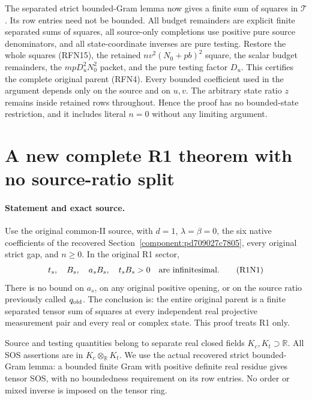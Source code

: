 The separated strict bounded-Gram lemma now gives a finite sum of
squares in $\mathcal T$.  Its row entries need not be bounded.  All
budget remainders are explicit finite separated sums of squares, all
source-only completions use positive pure source denominators, and
all state-coordinate inverses are pure testing.  Restore the whole
squares (RFN15), the retained $nv^2(N_0+pb)^2$ square, the scalar
budget remainders, the $mpD_u^2N_0^2$ packet, and the pure testing
factor $D_u$.  This certifies the complete original parent (RFN4).
Every bounded coefficient used in the argument depends only on the
source and on $u,v$.  The arbitrary state ratio $z$ remains inside
retained rows throughout.  Hence the proof has no bounded-state
restriction, and it includes literal $n=0$ without any limiting
argument.



\section{\texorpdfstring{A new complete R1 theorem with no source-ratio split}{A new complete R1 theorem with no source-ratio split}}
\label{component:pbaab204a8ab1}

\label{pbaab204a8ab1:sec:new-r1-all-tests}

\paragraph{Statement and exact source.}
Use the original common-II source, with $d=1$, $\lambda=\beta=0$,
the six native coefficients of the recovered
Section~\ref{component:pd709027c7805}, every original strict gap,
and $n\geq0$.  In the original R1 sector,
\[
 t_s,\quad B_s,\quad a_sB_s,\quad t_sB_s>0
 \quad\hbox{are infinitesimal}.                         \tag{R1N1}
\]
There is no bound on $a_s$, on any original positive opening, or on
the source ratio previously called $q_{\rm old}$.  The conclusion is:
the entire original parent is a finite separated tensor sum of
squares at every independent real projective measurement pair and
every real or complex state.  This proof treats R1 only.

Source and testing quantities belong to separate real closed fields
$K_c,K_t\supset\mathbb R$.  All SOS assertions are in
$K_c\otimes_{\mathbb R}K_t$.  We use the actual recovered strict
bounded-Gram lemma: a bounded finite Gram with positive definite
real residue gives tensor SOS, with no boundedness requirement on
its row entries.  No order or mixed inverse is imposed on the
tensor ring.

